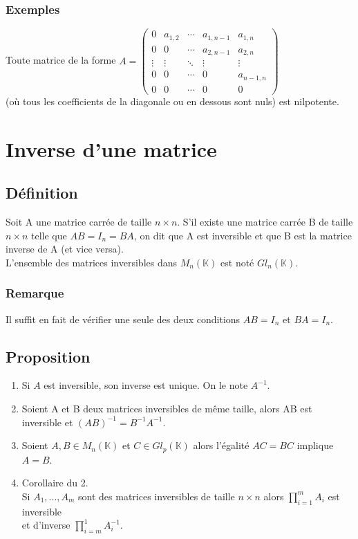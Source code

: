\documentclass[a4paper,10pt]{book} %
\newcommand{\K}{\mathbb{K}}
\begin{document}
\subsubsection{Exemples}
Toute matrice de la forme $A=\begin{pmatrix}
0 & a_{1,2} & \cdots & a_{1,n-1} & a_{1,n} \\
0 & 0 & \cdots & a_{2,n-1} & a_{2,n} \\
\vdots & \vdots & \ddots & \vdots & \vdots\\
0 & 0 & \cdots & 0 & a_{n-1,n}\\
0 & 0 & \cdots & 0 & 0 \end{pmatrix}$\\

(où tous les coefficients de la diagonale ou en dessous sont nuls) est nilpotente.

\newpage

\section{Inverse d'une matrice}
\subsection{Définition}
Soit A une matrice carrée de taille $n\times n$. S'il existe une matrice carrée B de taille $n\times n$ telle que $AB=I_{n}=BA$, on dit que A est inversible et que B est la matrice inverse de A (et vice versa).\\

L'ensemble des matrices inversibles dans $M_{n}(\K)$ est noté $Gl_{n}(\K)$.

\subsubsection{Remarque}
Il suffit en fait de vérifier une seule des deux conditions $AB=I_{n}$ et $BA=I_{n}$.

\subsection{Proposition}
\begin{enumerate}
\item Si $A$ est inversible, son inverse est unique. On le note $A^{-1}$.\\
\item Soient A et B deux matrices inversibles de même taille, alors AB est inversible et $(AB)^{-1}=B^{-1}A^{-1}$.\\
\item Soient $A,B\in M_{n}(\K)$ et $C\in Gl_{p}(\K)$ alors l'égalité $AC=BC$ implique $A=B$.\\
\item Corollaire du 2.\\
Si $A_{1},...,A_{m}$ sont des matrices inversibles de taille $n\times n$ alors $\prod\limits_{i=1}^{m}A_{i}$ est inversible\\
et d'inverse $\prod\limits_{i=m}^{1}A_{i}^{-1}$.
\end{enumerate}
\end{document}
